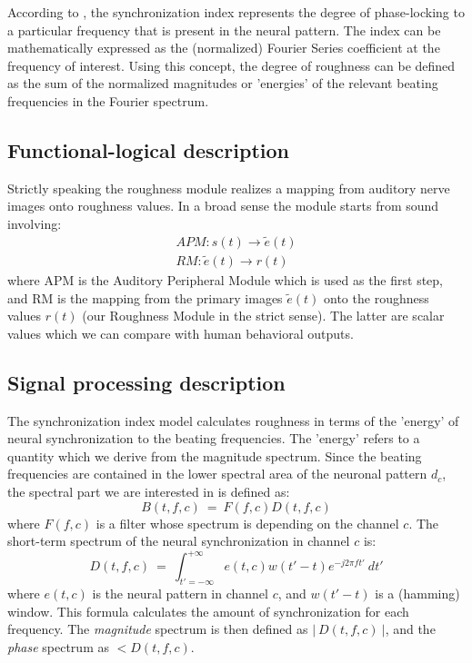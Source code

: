 According to , the synchronization
index represents the degree of phase-locking to a particular
frequency that is present in the neural pattern. The index can be
mathematically expressed as the (normalized) Fourier Series
coefficient at the frequency of interest. Using this concept, the
degree of roughness can be defined as the sum of the normalized
magnitudes or 'energies' of the relevant beating frequencies in
the Fourier spectrum.


\subsection{Functional-logical description}

Strictly speaking the roughness module realizes a mapping from
auditory nerve images onto roughness values. In a broad sense the
module starts from sound involving:
\begin{eqnarray}
    APM: s(t) \rightarrow \tilde{e}(t)\\
    RM: \tilde{e}(t) \rightarrow r(t)
\end{eqnarray}
where APM is the Auditory Peripheral Module which is used as the
first step, and RM is the mapping from the primary images
$\tilde{e}(t)$ onto the roughness values $r(t)$ (our Roughness
Module in the strict sense). The latter are scalar values which we
can compare with human behavioral outputs.

\subsection{Signal processing description}

The synchronization index model calculates roughness in terms of
the 'energy' of neural synchronization to the beating frequencies.
The 'energy' refers to a quantity which we derive from the
magnitude spectrum. Since the beating frequencies are contained
in the lower spectral area of the neuronal pattern $d_c$, the
spectral part we are interested in is defined as:
\begin{equation}
  B(t,f,c) ~=~ F(f,c)D(t,f,c)
\end{equation}
where $F(f,c)$ is a filter whose spectrum is depending on the
channel $c$. The short-term spectrum of the neural
synchronization in channel $c$ is:
\begin{equation}\label{E1}
  D(t,f,c)~=~\int_{t'=-\infty}^{+\infty} e(t,c)w(t'-t)e^{-j2\pi
  ft'}~dt'
\end{equation}
where $e(t,c)$ is the neural pattern in channel $c$, and $w(t'-t)$
is a (hamming) window. This formula calculates the amount of
synchronization for each frequency.  The \emph{magnitude}
spectrum is then defined as $\left|~D(t,f,c)~\right|$, and the
\emph{phase} spectrum as $<D(t,f,c)$.

